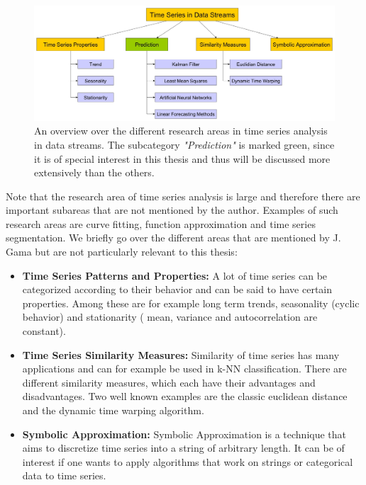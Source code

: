 \begin{figure}[h]
	\centering
  	\includegraphics[width=\textwidth]{timeSeriesInDataStreamsOverview}
	\caption{An overview over the different research areas in time series analysis in data streams. The subcategory \textit{"Prediction"} is marked green, since it is of special interest in this thesis and thus will be discussed more extensively than the others.}
	\label{fig_timeSeriesInDataStreamsOverview}
\end{figure}

Note that the research area of time series analysis is large and therefore there are important subareas that are not mentioned by the author. Examples of such research areas are curve fitting, function approximation and time series segmentation. We briefly go over the different areas that are mentioned by J. Gama but are not particularly relevant to this thesis:

\begin{itemize}
	\item \textbf{Time Series Patterns and Properties:} A lot of time series can be categorized according to their behavior and can be said to have certain properties. Among these are for example long term trends, seasonality (cyclic behavior) and stationarity ( mean, variance and autocorrelation are constant).
	\item \textbf{Time Series Similarity Measures:} Similarity of time series has many applications and can for example be used in k-NN classification. There are different similarity measures, which each have their advantages and disadvantages. Two well known examples are the classic euclidean distance and the dynamic time warping algorithm.
	\item \textbf{Symbolic Approximation:} Symbolic Approximation is a technique that aims to discretize time series into a string of arbitrary length. It can be of interest if one wants to apply algorithms that work on strings or categorical data to time series.
\end{itemize}


